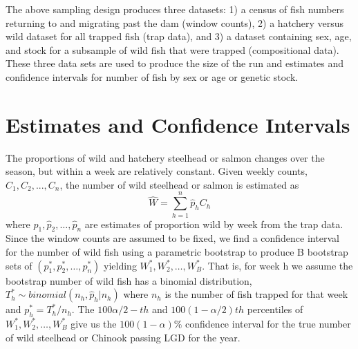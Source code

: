\documentclass[11pt]{article}
\begin{document}
The above sampling design produces three datasets: 1) a census of fish numbers returning to and migrating past the dam (window counts), 2) a hatchery versus wild dataset for all trapped fish (trap data), and 3) a dataset containing sex, age, and stock for a subsample of wild fish that were trapped (compositional data). These three data sets are used to produce the size of the run and estimates and confidence intervals for number of fish by sex or age or genetic stock.

\section{Estimates and Confidence Intervals}
The proportions of wild and hatchery steelhead or salmon changes over the season, but within a week are relatively constant. Given weekly counts, \(C_1,C_2,...,C_n\),   the number of wild steelhead or salmon is estimated as
\[\hat{W}=\sum\limits_{h=1}^{n} \hat{p}_hC_h\]	  
where \(\hat{p}_1, \hat{p}_2, \ldots, \hat{p}_n \) are estimates of proportion wild by week from the trap data.  Since the window counts are assumed to be fixed, we find a confidence interval for the number of wild fish using a parametric  bootstrap to produce B bootstrap sets of \((p^*_1, p^*_2, \ldots, p^*_n)\) yielding \(W^*_1, W^*_2, \ldots, W^*_B\).   That is, for week h we assume the bootstrap number of wild fish has a binomial distribution,  \(T^*_h\sim binomial(n_h,\hat{p}_h|n_h)\) where \(n_h\)  is the number of fish trapped for that  week and \(p^*_h = T^*_h/n_h\).  The \(100\alpha/2-th\) and \(100(1- \alpha/2)th\) percentiles of \(W^*_1, W^*_2, \ldots, W^*_B\) give us the \(100(1-\alpha)\%\) confidence interval for the true number of wild steelhead or Chinook passing LGD for the year.
\end{document}
